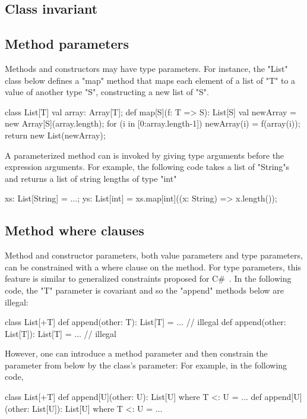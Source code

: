 \documentclass[nocopyrightspace,9pt]{sigplanconf}
\begin{document}
\subsection{Class invariant}

\subsection{Method parameters}

Methods and constructors may have type parameters.
For instance, the \xcd"List" class below defines a \xcd"map"
method that maps each element of a list of \xcd"T"
to a value of another type \xcd"S", constructing a new list of
\xcd"S".
\begin{xten}
class List[T] {
    val array: Array[T];
    def map[S](f: T => S): List[S] {
        val newArray = new Array[S](array.length);
        for (i in [0:array.length-1]) {
            newArray(i) = f(array(i));
        }
        return new List(newArray);
    }
}
\end{xten}


A parameterized method can is invoked by giving type arguments before the 
expression arguments.  For example, the following code takes a
list of \xcd"String"s and returns a list of string lengths of
type \xcd"int"
\begin{xten}
xs: List[String] = ...;
ys: List[int] = xs.map[int]((x: String) => x.length());
\end{xten}

\subsection{Method where clauses}

Method and constructor parameters, both value parameters and
type parameters, 
can be constrained with a where clause on the method.
For type parameters,
this feature is similar to generalized constraints proposed for
C\#~\cite{emir06}.
%
In the following code, the \xcd"T" parameter is covariant
and so the \xcd"append" methods below are illegal:
\begin{xten}
class List[+T] {
   def append(other: T): List[T] = { ... }        // illegal
   def append(other: List[T]): List[T] = { ... }  // illegal
}
\end{xten}
%
However, one can introduce a method parameter and then constrain
the parameter from below by the class's parameter:
For example, in the following code,
\begin{xten}
class List[+T] {
   def append[U](other: U): List[U] where T <: U = { ... }
   def append[U](other: List[U]): List[U] where T <: U = { ... }
}
\end{xten}
\end{document}
